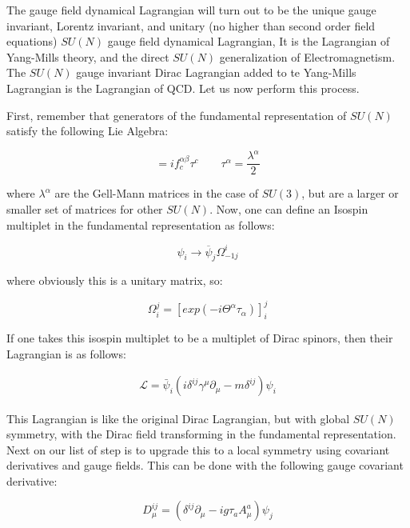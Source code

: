 \documentclass[a4]{article}
\begin{document}
    The gauge field dynamical Lagrangian will turn out to be the unique gauge invariant, Lorentz invariant, and unitary (no higher
    than second order field equations) $SU(N)$ gauge field dynamical Lagrangian, It is the Lagrangian of Yang-Mills theory, and the
    direct $SU(N)$ generalization of Electromagnetism. The $SU(N)$ gauge invariant Dirac Lagrangian added to te Yang-Mills Lagrangian
    is the Lagrangian of QCD. Let us now perform this process.

    First, remember that generators of the fundamental representation of $SU(N)$ satisfy the following Lie Algebra:

    \begin{equation}
        [\tau^{\alpha}, \tau^{\beta}] = i f^{\alpha \beta}_{c} \tau^{c} \qquad \tau^{\alpha} = \frac{\lambda^{\alpha}}{2}
    \end{equation}

    where $\lambda^{\alpha}$ are the Gell-Mann matrices in the case of $SU(3)$, but are a larger or smaller set of matrices for other
    $SU(N)$. Now, one can define an Isospin multiplet in the fundamental representation as follows: 

    \begin{equation}
        \psi_{i} \rightarrow \overline{\psi}_{j} \Omega_{-1 j}^{i} 
    \end{equation}

    where obviously this is a unitary matrix, so:

    \begin{equation}
        \Omega_{i}^{j} = [exp(-i \Theta^{\alpha} \tau_{\alpha})]_{i}^{j}
    \end{equation}

    If one takes this isospin multiplet to be a multiplet of Dirac spinors, then their Lagrangian is as follows:

    \begin{eqnarray}
        \mathcal{L} = \bar{\psi}_{i} (i \delta^{ij} \gamma^{\mu} \partial_{\mu} - m \delta^{ij}) \psi_{i}
    \end{eqnarray}

    This Lagrangian is like the original Dirac Lagrangian, but with global $SU(N)$ symmetry, with the Dirac field transforming in the
    fundamental representation. Next on our list of step is to upgrade this to a local symmetry using covariant derivatives and gauge
    fields. This can be done with the following gauge covariant derivative:

    \begin{equation}
        D^{ij}_{\mu} = (\delta^{i j} \partial_{\mu} - i g \tau_{a} A_{\mu}^{a}) \psi_{j}
    \end{equation}
\end{document}
